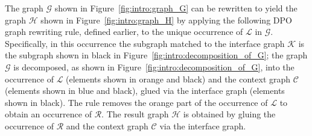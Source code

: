 \noindent The graph $\mathcal{G}$ shown in Figure~\ref{fig:intro:graph_G} can be rewritten to yield the graph $\mathcal{H}$ shown in Figure~\ref{fig:intro:graph_H} by applying the following DPO graph rewriting rule, defined earlier,
to the unique occurrence 
of $\mathcal{L}$ in $\mathcal{G}$.
Specifically, in this occurrence the subgraph matched to the interface graph $\mathcal{K}$ is the subgraph shown in black in Figure~\ref{fig:intro:decomposition_of_G}; the graph $\mathcal{G}$ is decomposed, as shown in Figure~\ref{fig:intro:decomposition_of_G}, into the occurrence of $\mathcal{L}$ (elements shown in orange and black) and the context graph $\mathcal{C}$ (elements shown in blue and black), glued via the interface graph (elements shown in black).
 The rule removes the orange part of the occurrence of $\mathcal{L}$ to obtain an occurrence of $\mathcal{R}$. 
The result graph $\mathcal{H}$ is obtained by gluing the occurrence of $\mathcal{R}$ and the context graph $\mathcal{C}$ via the interface graph.
